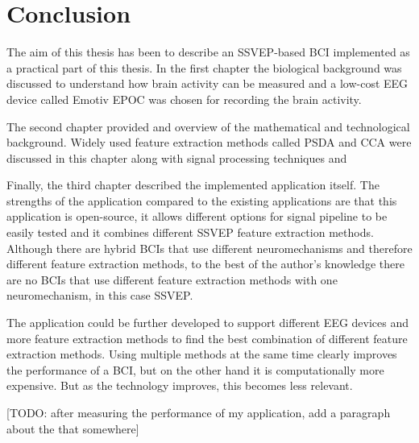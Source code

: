 
\chapter*{Conclusion}

The aim of this thesis has been to describe an \gls{SSVEP}-based \gls{BCI} implemented as a practical part of this thesis. In the first chapter the biological background was discussed to understand how brain activity can be measured and a low-cost \gls{EEG} device called Emotiv EPOC was chosen for recording the brain activity.

The second chapter provided and overview of the mathematical and technological background. Widely used \gls{feature extraction} methods called \gls{PSDA} and \gls{CCA} were discussed in this chapter along with signal processing techniques and 

Finally, the third chapter described the implemented application itself. The strengths of the application compared to the existing applications are that this application is open-source, it allows different options for signal pipeline to be easily tested and it combines different \gls{SSVEP} \gls{feature extraction} methods. Although there are hybrid \glspl{BCI} that use different neuromechanisms and therefore different \gls{feature extraction} methods, to the best of the author's knowledge there are no \glspl{BCI} that use different \gls{feature extraction} methods with one neuromechanism, in this case \gls{SSVEP}.

The application could be further developed to support different \gls{EEG} devices and more \gls{feature extraction} methods to find the best combination of different \gls{feature extraction} methods. Using multiple methods at the same time clearly improves the performance of a \gls{BCI}, but on the other hand it is computationally more expensive. But as the technology improves, this becomes less relevant.

[TODO: after measuring the performance of my application, add a paragraph about the that somewhere]

